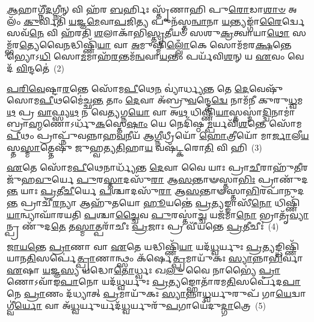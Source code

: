 \-\ul{𑌆}\-𑌹𑌾𑌗𑍍𑌨𑍀᳴\-\ul{𑌦}\-𑌗𑍍𑌨𑍀𑌨𑍍 𑌵𑌿 𑌹᳴𑌰 \ul{𑌬}\-𑌰𑍍\mbox{}𑌹𑌿𑌃 𑌸𑍍𑌤𑍃᳴𑌣𑌾𑌹𑌿 𑌪𑍁\-\ul{𑌰𑍋}\-𑌡𑌾\-\ul{𑌶𑌾}\-\-\ul{𑍞} 𑌅𑌲𑌂᳴ \ul{𑌕𑍁}\-𑌰𑍍𑌵𑌿𑌤𑌿᳴ \ul{𑌯}\-𑌜𑍍𑌞\-\ul{𑌮𑍇}\-𑌵𑌾\-\ul{𑌪}\-𑌜𑌿\-\ul{𑌤𑍍𑌯} 𑌪𑍁𑌨᳴𑌸𑍍𑌤\-\ul{𑌨𑍍𑌵𑌾}\-𑌨𑌾 \ul{𑌯}\-𑌨𑍍𑌤𑍍𑌯𑌙𑍍𑌗𑌾᳴\-\ul{𑌰𑍈}\-𑌰𑍍𑌦𑍍𑌵𑍇 𑌸𑌵᳴\-\ul{𑌨𑍇} 𑌵𑌿 𑌹᳴𑌰𑌤𑌿 \ul{𑌶}\-𑌲𑌾𑌕𑌾᳴𑌭𑌿\-\ul{𑌸𑍍𑌤𑍃}\-𑌤𑍀𑌯𑍞᳴ 𑌸𑌶𑍁\-\ul{𑌕𑍍𑌰}\-𑌤𑍍𑌵𑌾𑌯𑌾\-\ul{𑌥𑍋} 𑌸𑌮𑍍𑌭᳴𑌰\-\ul{𑌤𑍍𑌯𑍇}\-𑌵𑍈\-\ul{𑌨}\-𑌦𑍍𑌧𑌿𑌷𑍍𑌣𑌿᳴\-\ul{𑌯𑌾} 𑌵𑌾 \ul{𑌅}\-𑌮𑍁𑌷𑍍𑌮𑌿᳴\-\ul{𑌲𑍍𑌲𑍋𑌁}\-𑌕𑍇 𑌸𑍋𑌮᳴𑌮𑌰\-\ul{𑌕𑍍𑌷}\-𑌨𑍍𑌤𑍇𑌭𑍍𑌯𑍋\-𑌽\-\ul{𑌧𑌿} 𑌸𑍋\-\ul{𑌮}\-𑌮𑌾𑌹᳴\-\ul{𑌰}\-𑌨𑍍𑌤𑌮᳴\-\ul{𑌨𑍍𑌵}\-𑌵𑌾\-\ul{𑌯}\-𑌨𑍍𑌤𑌂 𑌪𑌰𑍍𑌯᳴𑌵𑌿\-\ul{𑌶}\-𑌨𑍍 𑌯 \ul{𑌏}\-𑌵𑌂 𑌵𑍇𑌦᳴ \ul{𑌵𑌿}\-𑌨𑍍𑌦𑌤𑍇॑~(2)

\-\ul{𑌪}\-\-\ul{𑌰𑌿}\-\-\ul{𑌵𑍇}\-𑌷𑍍𑌟𑌾\-\ul{𑌰}\-𑌨𑍍𑌤𑍇 𑌸𑍋᳴𑌮\-\ul{𑌪𑍀}\-𑌥𑍇\-\ul{𑌨} 𑌵𑍍𑌯𑌾॑𑌰𑍍𑌧𑍍𑌯\-\ul{𑌨𑍍𑌤} 𑌤𑍇 \ul{𑌦𑍇}\-𑌵𑍇𑌷𑍁᳴ 𑌸𑍋𑌮\-\ul{𑌪𑍀}\-𑌥𑌮𑍈॑𑌚𑍍𑌛\-\ul{𑌨𑍍𑌤} 𑌤𑌾𑌂 \ul{𑌦𑍇}\-𑌵𑌾 𑌅᳴𑌬𑍍𑌰𑍁\-\ul{𑌵}\-𑌨𑍍𑌦𑍍𑌵𑍇\-\ul{𑌦𑍍𑌵𑍇} 𑌨𑌾𑌮᳴𑌨𑍀 𑌕𑍁𑌰𑍁\-\ul{𑌧𑍍𑌵}\-𑌮\-\ul{𑌥} 𑌪𑍍𑌰 \ul{𑌵𑌾}\-𑌫𑍍𑌸𑍍𑌯\-\ul{𑌥} 𑌨 𑌵𑍇\-\ul{𑌤𑍍𑌯}\-𑌗𑍍𑌨\-\ul{𑌯𑍋} 𑌵𑌾 𑌅\-\ul{𑌥} 𑌧𑌿𑌷𑍍𑌣𑌿᳴\-\ul{𑌯𑌾}\-𑌸𑍍𑌤𑌸𑍍𑌮𑌾॑\-\ul{𑌦𑍍𑌦𑍍𑌵𑌿}\-𑌨𑌾𑌮𑌾॑ 𑌬𑍍𑌰𑌾\-\ul{𑌹𑍍𑌮}\-𑌣𑍋\-𑌽𑌰𑍍𑌧𑍁᳴\-\ul{𑌕}\-𑌸𑍍𑌤𑍇\-\ul{𑌷𑌾𑌂} 𑌯𑍇 𑌨𑍇𑌦𑌿᳴𑌷𑍍𑌠\-\ul{𑌮𑍍𑌪}\-𑌰𑍍𑌯𑌵𑌿᳴\-\ul{𑌶}\-𑌨𑍍𑌤𑍇 𑌸𑍋᳴𑌮\-\ul{𑌪𑍀}\-𑌥𑌂 𑌪𑍍𑌰𑌾𑌪𑍍𑌨𑍁᳴𑌵𑌨𑍍𑌨𑌾𑌹\-\ul{𑌵}\-𑌨𑍀𑌯᳴ 𑌆\-\ul{𑌗𑍍𑌨𑍀}\-𑌧𑍍𑌰𑍀𑌯𑍋᳴ \ul{𑌹𑍋}\-𑌤𑍍𑌰𑍀𑌯𑍋᳴ 𑌮𑌾\-\ul{𑌰𑍍𑌜𑌾}\-𑌲𑍀\-\ul{𑌯}\-𑌸𑍍𑌤\-\ul{𑌸𑍍𑌮𑌾}\-𑌤𑍍𑌤𑍇𑌷𑍁᳴ 𑌜𑍁𑌹𑍍𑌵𑌤𑍍𑌯\-\ul{𑌤𑌿}\-𑌹𑌾\-\ul{𑌯} 𑌵𑌷᳴𑌟𑍍𑌕𑌰𑍋\-\ul{𑌤𑌿} 𑌵𑌿 𑌹𑌿~(3)

\-\ul{𑌏}\-𑌤𑍇 𑌸𑍋᳴𑌮\-\ul{𑌪𑍀}\-𑌥𑍇𑌨𑌾𑌰𑍍𑌧𑍍𑌯᳴𑌨𑍍𑌤 \ul{𑌦𑍇}\-𑌵𑌾 𑌵𑍈 𑌯𑌾𑌃 𑌪𑍍𑌰𑌾\-\ul{𑌚𑍀}\-𑌰𑌾𑌹𑍁᳴\-\ul{𑌤𑍀}\-𑌰𑌜𑍁᳴𑌹\-\ul{𑌵𑍁}\-𑌰𑍍𑌯𑍇 \ul{𑌪𑍁}\-𑌰\-\ul{𑌸𑍍𑌤𑌾}\-𑌦𑌸𑍁᳴\-\ul{𑌰𑌾} 𑌆\-\ul{𑌸}\-𑌨𑍍𑌤𑌾𑍟𑌸𑍍𑌤𑌾\-\ul{𑌭𑌿𑌃} 𑌪𑍍𑌰𑌾𑌣𑍁᳴𑌦\-\ul{𑌨𑍍𑌤} 𑌯𑌾𑌃 \ul{𑌪𑍍𑌰}\-𑌤𑍀\-\ul{𑌚𑍀}\-𑌰𑍍𑌯𑍇 \ul{𑌪}\-𑌶𑍍𑌚𑌾𑌦𑌸𑍁᳴\-\ul{𑌰𑌾} 𑌆\-\ul{𑌸}\-𑌨𑍍𑌤𑌾𑍟𑌸𑍍𑌤𑌾\-\ul{𑌭𑌿}\-𑌰𑌪𑌾᳴𑌨𑍁𑌦\-\ul{𑌨𑍍𑌤} 𑌪𑍍𑌰𑌾𑌚𑍀᳴\-\ul{𑌰}\-𑌨𑍍𑌯𑌾 𑌆𑌹𑍁᳴𑌤𑌯𑍋 \ul{𑌹𑍂}\-𑌯𑌨𑍍𑌤𑍇॑ \ul{𑌪𑍍𑌰}\-𑌤𑍍𑌯𑌙𑍍𑌙𑌾𑌸𑍀᳴\-\ul{𑌨𑍋} 𑌧𑌿𑌷𑍍𑌣𑌿᳴\-\ul{𑌯𑌾}\-𑌨𑍍𑌵𑍍𑌯𑌾𑌘𑌾᳴𑌰𑌯𑌤𑌿 \ul{𑌪}\-𑌶𑍍𑌚𑌾\-\ul{𑌚𑍍𑌚𑍈}\-𑌵 \ul{𑌪𑍁}\-𑌰𑌸𑍍𑌤𑌾॑\-\ul{𑌚𑍍𑌚} 𑌯𑌜᳴𑌮𑌾\-\ul{𑌨𑍋} 𑌭𑍍𑌰𑌾𑌤𑍃᳴\-\ul{𑌵𑍍𑌯𑌾}\-𑌨𑍍𑌪𑍍𑌰 𑌣𑍁᳴𑌦\-\ul{𑌤𑍇} 𑌤\-\ul{𑌸𑍍𑌮𑌾}\-𑌤𑍍𑌪𑌰𑌾᳴𑌚𑍀𑌃 \ul{𑌪𑍍𑌰}\-𑌜𑌾𑌃 𑌪𑍍𑌰 𑌵𑍀᳴𑌯𑌨𑍍𑌤𑍇 \ul{𑌪𑍍𑌰}\-𑌤𑍀𑌚𑍀𑌃॑~(4)

\-\ul{𑌜𑌾}\-\-\ul{𑌯}\-\-\ul{𑌨𑍍𑌤𑍇} \ul{𑌪𑍍𑌰𑌾}\-𑌣𑌾 𑌵𑌾 \ul{𑌏}\-𑌤𑍇 𑌯𑌦𑍍𑌧𑌿𑌷𑍍𑌣𑌿᳴\-\ul{𑌯𑌾} 𑌯𑌦᳴\-\ul{𑌧𑍍𑌵}\-𑌰𑍍𑌯𑍁𑌃 \ul{𑌪𑍍𑌰}\-𑌤𑍍𑌯𑌙𑍍𑌧𑌿𑌷𑍍𑌣𑌿᳴𑌯𑌾𑌨\-\ul{𑌤𑌿}\-𑌸𑌰𑍍𑌪𑍇॑\-\ul{𑌤𑍍𑌪𑍍𑌰𑌾}\-𑌣𑌾𑌨𑍍𑌥𑍍𑌸𑌂 𑌕᳴𑌰𑍍\mbox{}𑌷𑍇\-\ul{𑌤𑍍𑌪𑍍𑌰}\-𑌮𑌾𑌯𑍁᳴𑌕𑌃 \ul{𑌸𑍍𑌯𑌾}\-𑌨𑍍𑌨𑌾\-\ul{𑌭𑌿}\-𑌰𑍍𑌵𑌾 \ul{𑌏}\-𑌷𑌾 \ul{𑌯}\-𑌜𑍍𑌞\-\ul{𑌸𑍍𑌯} 𑌯𑌦𑍍𑌧𑍋\-\ul{𑌤𑍋}\-𑌰𑍍𑌧𑍍𑌵𑌃 𑌖\-\ul{𑌲𑍁} 𑌵𑍈 𑌨𑌾𑌭𑍍𑌯𑍈॑ \ul{𑌪𑍍𑌰𑌾}\-𑌣𑍋\-𑌽𑌵𑌾᳴𑌙\-\ul{𑌪𑌾}\-𑌨𑍋 𑌯𑌦᳴\-\ul{𑌧𑍍𑌵}\-𑌰𑍍𑌯𑍁𑌃 \ul{𑌪𑍍𑌰}\-𑌤𑍍𑌯𑌙𑍍𑌹𑍋𑌤𑌾᳴𑌰𑌮\-\ul{𑌤𑌿}\-𑌸𑌰𑍍𑌪𑍇᳴𑌦\-\ul{𑌪𑌾}\-𑌨𑍇 \ul{𑌪𑍍𑌰𑌾}\-𑌣𑌂 𑌦᳴𑌧𑍍𑌯𑌾𑌤𑍍 \ul{𑌪𑍍𑌰}\-𑌮𑌾𑌯𑍁᳴𑌕𑌃 \ul{𑌸𑍍𑌯𑌾}\-𑌨𑍍𑌨𑌾\-\ul{𑌧𑍍𑌵}\-𑌰𑍍𑌯𑍁𑌰𑍁𑌪᳴ 𑌗𑌾\-\ul{𑌯𑍇}\-𑌦𑍍𑌵𑌾𑌗𑍍𑌵𑍀॑\-\ul{𑌰𑍍𑌯𑍋} 𑌵𑌾 𑌅᳴\-\ul{𑌧𑍍𑌵}\-𑌰𑍍𑌯𑍁𑌰𑍍𑌯𑌦᳴\-\ul{𑌧𑍍𑌵}\-𑌰𑍍𑌯𑍁𑌰𑍁᳴\-\ul{𑌪}\-𑌗𑌾𑌯𑍇᳴𑌦𑍁\-\ul{𑌦𑍍𑌗𑌾}\-𑌤𑍍𑌰𑍇~(5)

